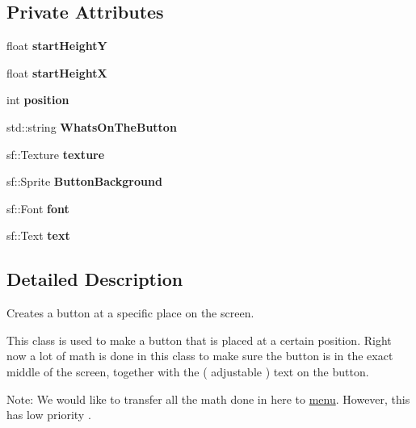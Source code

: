 \subsection*{Private Attributes}
\begin{DoxyCompactItemize}
\item 
\mbox{\label{class_button_afe532ea0d5dd3fea5341ba1cb3e64e0b}} 
float {\bfseries start\+HeightY}
\item 
\mbox{\label{class_button_a954fb7025b688b7b2a4d8d16adca74eb}} 
float {\bfseries start\+HeightX}
\item 
\mbox{\label{class_button_a6853c434f05010c4b2582fb757f96bef}} 
int {\bfseries position}
\item 
\mbox{\label{class_button_a960b5ee6c11f9385763838b1d788f010}} 
std\+::string {\bfseries Whats\+On\+The\+Button}
\item 
\mbox{\label{class_button_aa0cf48f8db00201090fbbd702ee81fb9}} 
sf\+::\+Texture {\bfseries texture}
\item 
\mbox{\label{class_button_ab1ca1099a4726cdb09a7abd641685a6a}} 
sf\+::\+Sprite {\bfseries Button\+Background}
\item 
\mbox{\label{class_button_ab6290d275363f4b0e133eec450845ca1}} 
sf\+::\+Font {\bfseries font}
\item 
\mbox{\label{class_button_aadf908b0777f2ae5c28d949fda3384c1}} 
sf\+::\+Text {\bfseries text}
\end{DoxyCompactItemize}


\subsection{Detailed Description}
Creates a button at a specific place on the screen. 

This class is used to make a button that is placed at a certain position. Right now a lot of math is done in this class to make sure the button is in the exact middle of the screen, together with the ( adjustable ) text on the button.

Note\+: We would like to transfer all the math done in here to \hyperlink{classmenu}{menu}. However, this has low priority .

